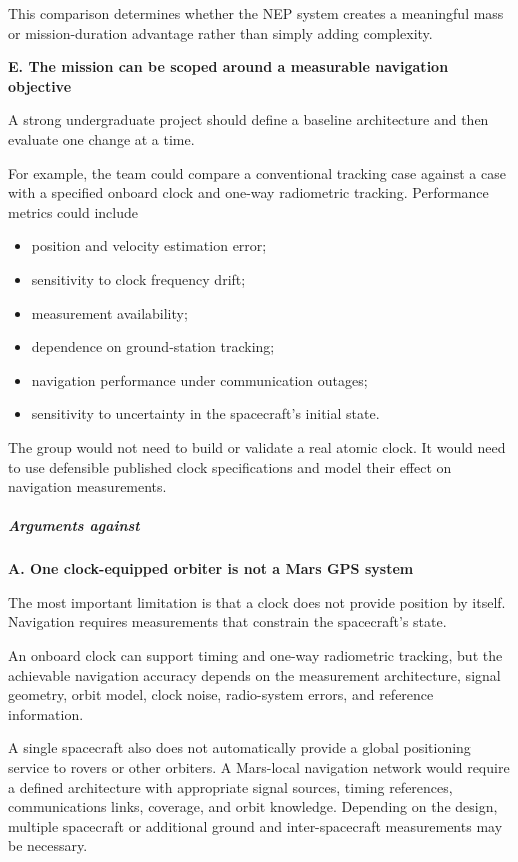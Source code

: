 This comparison determines whether the NEP system creates a
meaningful mass or mission-duration advantage rather than simply
adding complexity.

\textbf{E. The mission can be scoped around a measurable
	navigation objective}

A strong undergraduate project should define a baseline architecture
and then evaluate one change at a time.

For example, the team could compare a conventional tracking case
against a case with a specified onboard clock and one-way
radiometric tracking. Performance metrics could include

\begin{itemize}
	\item position and velocity estimation error;
	\item sensitivity to clock frequency drift;
	\item measurement availability;
	\item dependence on ground-station tracking;
	\item navigation performance under communication outages;
	\item sensitivity to uncertainty in the spacecraft's initial state.
\end{itemize}

The group would not need to build or validate a real atomic clock.
It would need to use defensible published clock specifications
and model their effect on navigation measurements.

\subparagraph{Arguments against}

\textbf{A. One clock-equipped orbiter is not a Mars GPS system}

The most important limitation is that a clock does not provide
position by itself. Navigation requires measurements that constrain
the spacecraft's state.

An onboard clock can support timing and one-way radiometric
tracking, but the achievable navigation accuracy depends on the
measurement architecture, signal geometry, orbit model, clock
noise, radio-system errors, and reference information.

A single spacecraft also does not automatically provide a global
positioning service to rovers or other orbiters. A Mars-local
navigation network would require a defined architecture with
appropriate signal sources, timing references, communications
links, coverage, and orbit knowledge. Depending on the design,
multiple spacecraft or additional ground and inter-spacecraft
measurements may be necessary.

